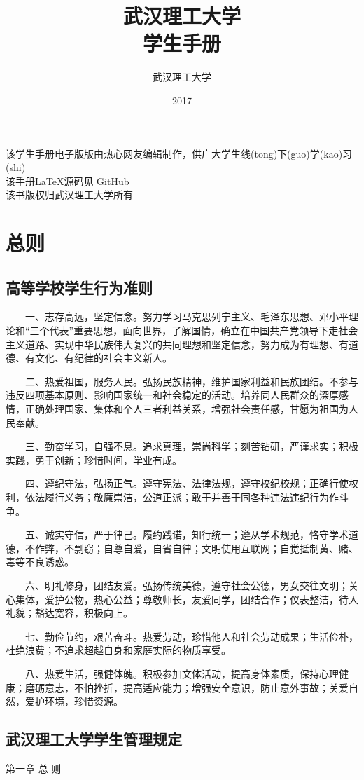 \documentclass[UTF8,12pt,a4paper]{report}
\title{\textbf{武汉理工大学} \\ \textbf{学生手册}}
\author{武汉理工大学}
\date{2017}
\begin{document}
	
	\maketitle
该学生手册电子版版由热心网友编辑制作，供广大学生线(tong)下(guo)学(kao)习(shi)\\
该手册\LaTeX 源码见 \href{https://github.com/Markhng/WHUT-Student-Handbook/}{GitHub}\\
该书版权归武汉理工大学所有
	\tableofcontents
\part{总则}
\chapter{高等学校学生行为准则}
　　一、志存高远，坚定信念。努力学习马克思列宁主义、毛泽东思想、邓小平理论和“三个代表”重要思想，面向世界，了解国情，确立在中国共产党领导下走社会主义道路、实现中华民族伟大复兴的共同理想和坚定信念，努力成为有理想、有道德、有文化、有纪律的社会主义新人。

　　二、热爱祖国，服务人民。弘扬民族精神，维护国家利益和民族团结。不参与违反四项基本原则、影响国家统一和社会稳定的活动。培养同人民群众的深厚感情，正确处理国家、集体和个人三者利益关系，增强社会责任感，甘愿为祖国为人民奉献。

　　三、勤奋学习，自强不息。追求真理，崇尚科学；刻苦钻研，严谨求实；积极实践，勇于创新；珍惜时间，学业有成。

　　四、遵纪守法，弘扬正气。遵守宪法、法律法规，遵守校纪校规；正确行使权利，依法履行义务；敬廉崇洁，公道正派；敢于并善于同各种违法违纪行为作斗争。

　　五、诚实守信，严于律己。履约践诺，知行统一；遵从学术规范，恪守学术道德，不作弊，不剽窃；自尊自爱，自省自律；文明使用互联网；自觉抵制黄、赌、毒等不良诱惑。

　　六、明礼修身，团结友爱。弘扬传统美德，遵守社会公德，男女交往文明；关心集体，爱护公物，热心公益；尊敬师长，友爱同学，团结合作；仪表整洁，待人礼貌；豁达宽容，积极向上。

　　七、勤俭节约，艰苦奋斗。热爱劳动，珍惜他人和社会劳动成果；生活俭朴，杜绝浪费；不追求超越自身和家庭实际的物质享受。

　　八、热爱生活，强健体魄。积极参加文体活动，提高身体素质，保持心理健康；磨砺意志，不怕挫折，提高适应能力；增强安全意识，防止意外事故；关爱自然，爱护环境，珍惜资源。	
		\chapter{武汉理工大学学生管理规定}
第一章    总 则
\end{document}
